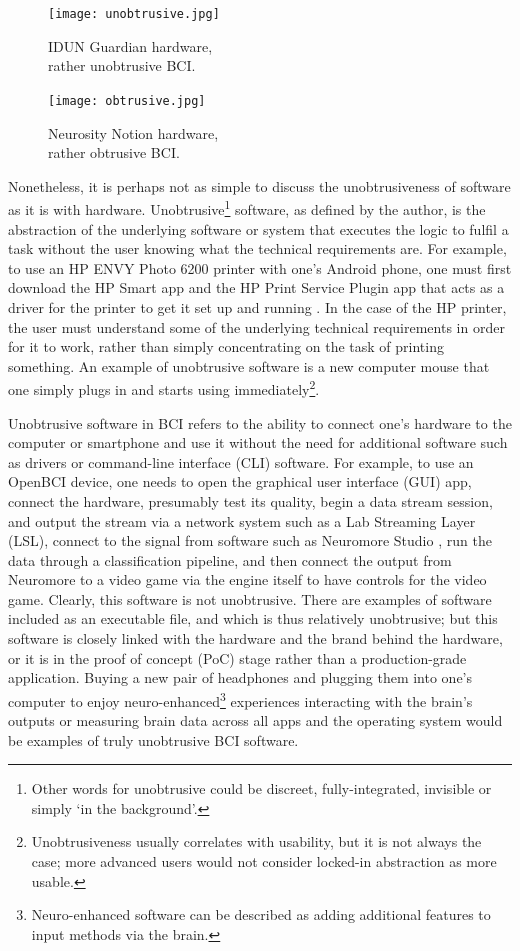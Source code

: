 \begin{figure}[!ht]
  \texttt{[image: unobtrusive.jpg]}
  \caption{IDUN Guardian hardware, \\ rather unobtrusive BCI.}
  \label{fig:unobstrusive-hardware}
  \endminipage\hfill
  \texttt{[image: obtrusive.jpg]}
  \caption{Neurosity Notion hardware, \\ rather obtrusive BCI.}
  \label{fig:obstrusive-hardware}
  \endminipage\hfill
\end{figure}

Nonetheless, it is perhaps not as simple to discuss the unobtrusiveness of software as it is with hardware. Unobtrusive\footnote{Other words for unobtrusive could be discreet, fully-integrated, invisible or simply ‘in the background’.} software, as defined by the author, is the abstraction of the underlying software or system that executes the logic to fulfil a task without the user knowing what the technical requirements are. For example, to use an HP ENVY Photo 6200 printer with one’s Android phone, one must first download the HP Smart app and the HP Print Service Plugin app that acts as a driver for the printer to get it set up and running \citep{hp_hp_nodate}. In the case of the HP printer, the user must understand some of the underlying technical requirements in order for it to work, rather than simply concentrating on the task of printing something. An example of unobtrusive software is a new computer mouse that one simply plugs in and starts using immediately\footnote{Unobtrusiveness usually correlates with usability, but it is not always the case; more advanced users would not consider locked-in abstraction as more usable.}.

Unobtrusive software in BCI refers to the ability to connect one’s hardware to the computer or smartphone and use it without the need for additional software such as drivers or command-line interface (CLI) software. For example, to use an OpenBCI device, one needs to open the graphical user interface (GUI) app, connect the hardware, presumably test its quality, begin a data stream session, and output the stream via a network system such as a Lab Streaming Layer (LSL), connect to the signal from software such as Neuromore Studio \citep{openbci_neuromore_nodate}, run the data through a classification pipeline, and then connect the output from Neuromore to a video game via the engine itself to have controls for the video game. Clearly, this software is not unobtrusive. There are examples of software included as an executable file, and which is thus relatively unobtrusive; but this software is closely linked with the hardware and the brand behind the hardware, or it is in the proof of concept (PoC) stage rather than a production-grade application. Buying a new pair of headphones and plugging them into one’s computer to enjoy neuro-enhanced\footnote{Neuro-enhanced software can be described as adding additional features to input methods via the brain.} experiences interacting with the brain’s outputs or measuring brain data across all apps and the operating system would be examples of truly unobtrusive BCI software.

